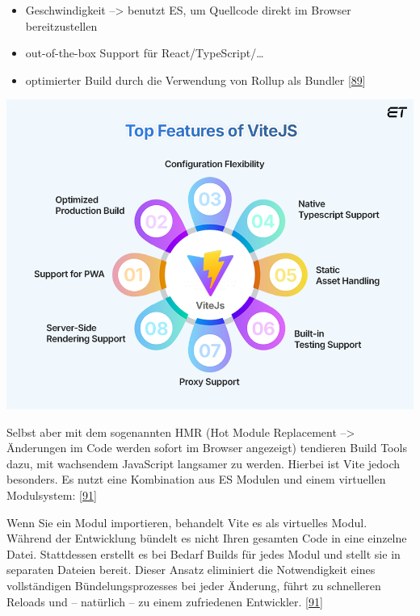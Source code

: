 \documentclass[
    headings=optiontotocandhead,%
    twoside,
    numbers=noenddot,%
    12pt, %
    titlepage, %
    parskip=full, %
    listof=leveldown, 
    numbers=noenddot, %
    a4paper,DIV=14,
    BCOR=15mm,
]{scrbook}
\let\origfigure=\figure
\let\endorigfigure=\endfigure
\renewenvironment{figure}[1][]{%
   \origfigure[H]
}{%
   \endorigfigure
}
\renewenvironment{quote}{\begin{customblockquote}\list{}{\rightmargin=0em\leftmargin=0em}%
\item\relax\color{blockquote-text}\ignorespaces}{\unskip\unskip\endlist\end{customblockquote}}
\providecommand{\tightlist}{%
  \setlength{\itemsep}{0pt}\setlength{\parskip}{0pt}}
\begin{document}
\begin{itemize}
\tightlist
\item
  Geschwindigkeit --\textgreater{} benutzt ES, um Quellcode direkt im
  Browser bereitzustellen
\item
  out-of-the-box Support für React/TypeScript/\ldots{}
\item
  optimierter Build durch die Verwendung von Rollup als Bundler
  {[}\protect\hyperlink{ref-CodeParrot-BuildTools}{89}{]}
\end{itemize}

\begin{figure}
\centering
\includegraphics[width=1\textwidth,height=\textheight]{img/Gekle/Vite-Features.png}
\caption{Funktionen von Vite
\protect\hyperlink{ref-eluminoustechnologies-vite}{90}}
\end{figure}

Selbst aber mit dem sogenannten HMR (Hot Module Replacement
--\textgreater{} Änderungen im Code werden sofort im Browser angezeigt)
tendieren Build Tools dazu, mit wachsendem JavaScript langsamer zu
werden. Hierbei ist Vite jedoch besonders. Es nutzt eine Kombination aus
ES Modulen und einem virtuellen Modulsystem:
{[}\protect\hyperlink{ref-Telerik-BuildTools}{91}{]}

\begin{quote}
Wenn Sie ein Modul importieren, behandelt Vite es als virtuelles Modul.
Während der Entwicklung bündelt es nicht Ihren gesamten Code in eine
einzelne Datei. Stattdessen erstellt es bei Bedarf Builds für jedes
Modul und stellt sie in separaten Dateien bereit. Dieser Ansatz
eliminiert die Notwendigkeit eines vollständigen Bündelungsprozesses bei
jeder Änderung, führt zu schnelleren Reloads und -- natürlich -- zu
einem zufriedenen Entwickler.
{[}\protect\hyperlink{ref-Telerik-BuildTools}{91}{]}
\end{quote}
\end{document}
